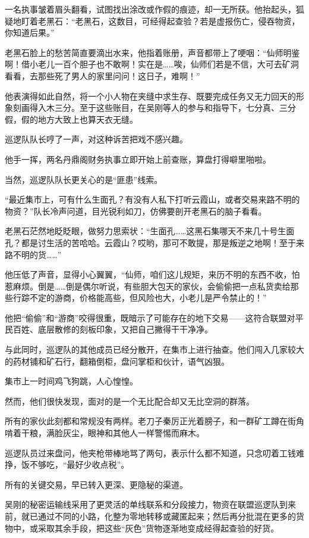 一名执事皱着眉头翻看，试图找出涂改或作假的痕迹，却一无所获。他抬起头，狐疑地盯着老黑石：“老黑石，这数目，可经得起查验？若是虚报伤亡，侵吞物资，你知道后果。”

老黑石脸上的愁苦简直要滴出水来，他指着账册，声音都带上了哽咽：“仙师明鉴啊！借小老儿一百个胆子也不敢啊！实在是……唉，仙师们若是不信，大可去矿洞看看，去那些死了男人的家里问问！这日子，难啊！”

他表演得如此自然，将一个小人物在夹缝中求生存、既要完成任务又无力回天的形象刻画得入木三分。至于这些账目，在吴刚等人的参与和指导下，七分真、三分假，假的地方大致上也算天衣无缝。

巡逻队队长哼了一声，对这种诉苦把戏不感兴趣。

他手一挥，两名丹鼎阁财务执事立即开始上前查账，算盘打得噼里啪啦。

当然，巡逻队队长更关心的是“匪患”线索。

“最近集市上，可有什么生面孔？有没有人私下打听云霞山，或者交易来路不明的物资？”队长冷声问道，目光锐利如刀，仿佛要剖开老黑石的脑子看看。

老黑石茫然地眨眨眼，做努力思索状：“生面孔……这黑石集哪天不来几十号生面孔？都是讨生活的苦哈哈。云霞山？哎哟，那可不敢提，那是叛逆之地啊！至于来路不明的货……”

他压低了声音，显得小心翼翼，“仙师，咱们这儿规矩，来历不明的东西不收，怕惹麻烦。倒是……倒是偶尔听说，有些胆大包天的家伙，会偷偷把一点私货卖给那些行踪不定的游商，价格能高些，但风险也大，小老儿是严令禁止的！”

他把“偷偷”和“游商”咬得很重，既暗示了可能存在的地下交易——这符合联盟对平民百姓、底层散修的刻板印象，又把自己撇得干干净净。

与此同时，巡逻队的其他成员已经分散开，在集市上进行抽查。他们闯入几家较大的药材铺和矿石行，翻箱倒柜，盘问掌柜和伙计，语气凶狠。

集市上一时间鸡飞狗跳，人心惶惶。

然而，他们很快发现，面对的是一个无比配合却又无比空洞的群落。

所有的家伙此刻都和常规没有两样。老刀子秦厉正光着膀子，和一群矿工蹲在街角啃着干粮，满脸灰尘，眼神和其他人一样警惕而麻木。

巡逻队员过来盘问，他夹枪带棒地骂了两句，表示什么都不知道，只念叨着工钱难挣，饭不够吃，“最好少收点税”。

所有的关键交易，早已转入更深、更隐秘的渠道。

吴刚的秘密运输线采用了更灵活的单线联系和分段接力，物资在联盟巡逻队到来前，就已通过不同的小路，化整为零地转移或藏匿起来；然后再分批混在更多的货物中，或采取其余手段，把这些“灰色”货物逐渐地变成经得起查验的好货。

